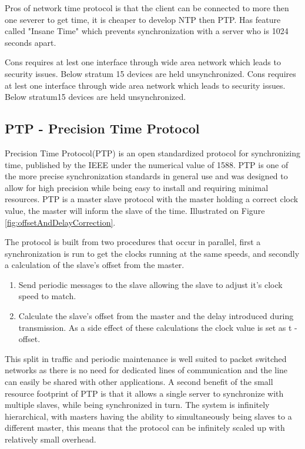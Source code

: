 \noindent Pros of network time protocol is that the client can be connected to more then one severer to get time, it is cheaper to develop NTP then PTP. Has feature called "Insane Time" which prevents synchronization with a server who is 1024 seconds apart.

\noindent Cons requires at lest one interface through wide area network which leads to security issues. Below stratum
15 devices are held unsynchronized.
Cons requires at lest one interface through wide area network which leads to security issues. Below stratum15 devices are held unsynchronized.

\subsection{PTP - Precision Time Protocol}
Precision Time Protocol(PTP) is an open standardized protocol for synchronizing time, published by the IEEE under the numerical value of 1588. PTP is one of the more precise synchronization standards in general use and was designed to allow for high precision while being easy to install and requiring minimal resources. PTP is a master slave protocol with the master holding a correct clock value, the master will inform the slave of the time.  Illustrated on Figure \ref{fig:offsetAndDelayCorrection}.

The protocol is built from two procedures that occur in parallel, first a synchronization is run to get the clocks running at the same speeds, and secondly a calculation of the slave's offset from the master.
\begin{enumerate}
	\item Send periodic messages to the slave allowing the slave to adjust it's clock speed to match.
	\item Calculate the slave's offset from the master and the delay introduced during transmission. As a side effect of these calculations the clock value is set as t - offset.
\end{enumerate}

This split in traffic and periodic maintenance is well suited to packet switched networks as there is no need for dedicated lines of communication and the line can easily be shared with other applications. A second benefit of the small resource footprint of PTP is that it allows a single server to synchronize with multiple slaves, while being synchronized in turn. The system is infinitely hierarchical, with masters having the ability to simultaneously being slaves to a different master, this means that the protocol can be infinitely scaled up with relatively small overhead.

